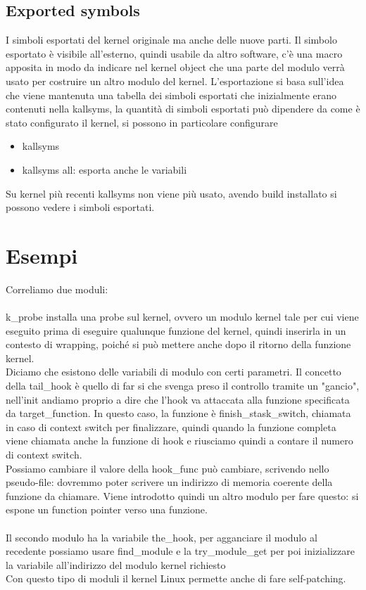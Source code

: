 \documentclass[12pt, oneside]{extbook}
\begin{document}
\subsection{Exported symbols}
I simboli esportati del kernel originale ma anche delle nuove parti. Il simbolo esportato è visibile all'esterno, quindi usabile da altro software, c'è una macro apposita in modo da indicare nel kernel object che una parte del modulo verrà usato per costruire un altro modulo del kernel. L'esportazione si basa sull'idea che viene mantenuta una tabella dei simboli esportati che inizialmente erano contenuti nella kallsyms, la quantità di simboli esportati può dipendere da come è stato configurato il kernel, si possono in particolare configurare
\begin{itemize}
\item kallsyms
\item kallsyms all: esporta anche le variabili
\end{itemize}
Su kernel più recenti kallsyms non viene più usato, avendo build installato si possono vedere i simboli esportati.\\
\section*{Esempi}
Correliamo due moduli:\\\\k\_probe installa una probe sul kernel, ovvero un modulo kernel tale per cui viene eseguito prima di eseguire qualunque funzione del kernel, quindi inserirla in un contesto di wrapping, poiché si può mettere anche dopo il ritorno della funzione kernel.\\ Diciamo che esistono delle variabili di modulo con certi parametri. Il concetto della tail\_hook è quello di far si che svenga preso il controllo tramite un "gancio", nell'init andiamo proprio a dire che l'hook va attaccata alla funzione specificata da target\_function. In questo caso, la funzione è \textsf{finish\_stask\_switch}, chiamata in caso di context switch per finalizzare, quindi quando la funzione completa viene chiamata anche la funzione di hook e riusciamo quindi a contare il numero di context switch.\\Possiamo cambiare il valore della hook\_func può cambiare, scrivendo nello pseudo-file: dovremmo poter scrivere un indirizzo di memoria coerente della funzione da chiamare. Viene introdotto quindi un altro modulo per fare questo: si espone un function pointer verso una funzione.\\\\Il secondo modulo ha la variabile \textsf{the\_hook}, per agganciare il modulo al recedente possiamo usare \textsf{find\_module} e la \textsf{try\_module\_get} per poi inizializzare la variabile all'indirizzo del modulo kernel richiesto\\Con questo tipo di moduli il kernel Linux permette anche di fare self-patching.
\end{document}
